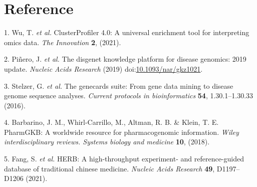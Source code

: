 \documentclass[
]{article}
\newenvironment{cslreferences}%
  {}%
  {\par}
\begin{document}
\hypertarget{bibliography}{%
\section*{Reference}\label{bibliography}}

\hypertarget{refs}{}
\begin{cslreferences}
\leavevmode\hypertarget{ref-ClusterprofilerWuTi2021}{}%
1. Wu, T. \emph{et al.} ClusterProfiler 4.0: A universal enrichment tool for interpreting omics data. \emph{The Innovation} \textbf{2}, (2021).

\leavevmode\hypertarget{ref-TheDisgenetKnPinero2019}{}%
2. Piñero, J. \emph{et al.} The disgenet knowledge platform for disease genomics: 2019 update. \emph{Nucleic Acids Research} (2019) doi:\href{https://doi.org/10.1093/nar/gkz1021}{10.1093/nar/gkz1021}.

\leavevmode\hypertarget{ref-TheGenecardsSStelze2016}{}%
3. Stelzer, G. \emph{et al.} The genecards suite: From gene data mining to disease genome sequence analyses. \emph{Current protocols in bioinformatics} \textbf{54}, 1.30.1--1.30.33 (2016).

\leavevmode\hypertarget{ref-PharmgkbAWorBarbar2018}{}%
4. Barbarino, J. M., Whirl-Carrillo, M., Altman, R. B. \& Klein, T. E. PharmGKB: A worldwide resource for pharmacogenomic information. \emph{Wiley interdisciplinary reviews. Systems biology and medicine} \textbf{10}, (2018).

\leavevmode\hypertarget{ref-HerbAHighThFang2021}{}%
5. Fang, S. \emph{et al.} HERB: A high-throughput experiment- and reference-guided database of traditional chinese medicine. \emph{Nucleic Acids Research} \textbf{49}, D1197--D1206 (2021).
\end{cslreferences}
\end{document}
